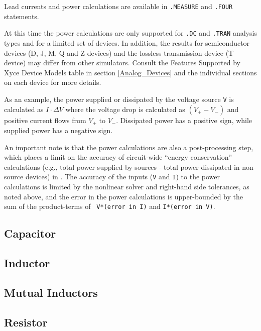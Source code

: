 Lead currents and power calculations are available in
\texttt{.MEASURE} and \texttt{.FOUR} statements.

At this time the power calculations are only supported for {\tt .DC}
and {\tt .TRAN} analysis types and for a limited set of devices. In
addition, the results for semiconductor devices (D, J, M, Q and Z
devices) and the lossless transmission device (T device) may differ
from other simulators.  Consult the Features Supported by Xyce Device
Models table in section \ref{Analog_Devices} and the individual
sections on each device for more details.

As an example, the power supplied or dissipated by the voltage source
{\tt V} is calculated as $I \cdot \Delta V$ where the voltage drop is
calculated as $(V_+ - V_-)$ and positive current flows from $V_+$ to
$V_-$.  Dissipated power has a positive sign, while supplied power has
a negative sign.

An important note is that the power calculations are also a
post-processing step, which places a limit on the accuracy of
circuit-wide ``energy conservation'' calculations (e.g., total power
supplied by sources - total power dissipated in non-source devices) in
\Xyce{}.  The accuracy of the inputs ({\tt V} and {\tt I}) to the
power calculations is limited by the nonlinear solver and right-hand
side tolerances, as noted above, and the error in the power
calculations is upper-bounded by the sum of the product-terms of {\tt
  V*(error in I)} and {\tt I*(error in V)}.


\clearpage
\subsection{Capacitor}
 


\clearpage
\subsection{Inductor}
 


\clearpage
\subsection{Mutual Inductors}
\label{MutualInductor}
 


\clearpage
\subsection{Resistor}
 


